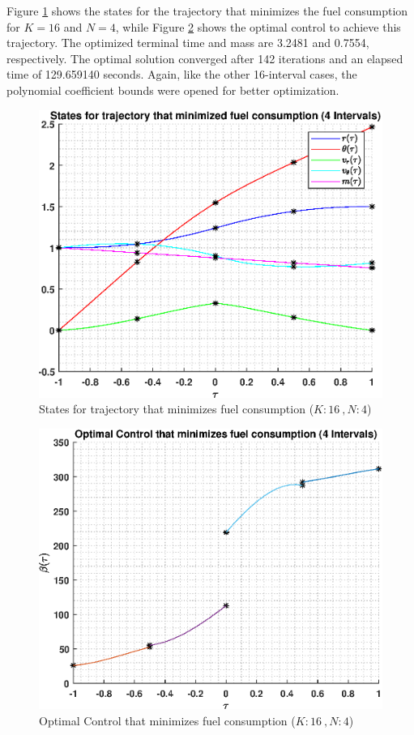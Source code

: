 \documentclass[]{article}
\begin{document}
\vspace{2mm}\newline 
Figure \ref{fig:directStatesK16Poly4} shows the states for the trajectory that minimizes the fuel consumption for \(K = 16\) and  \(N = 4\), while Figure \ref{fig:directControlK16Poly4} shows the optimal control to achieve this trajectory. The optimized terminal time and mass are 3.2481 and 0.7554, respectively. The optimal solution converged after 142 iterations and an elapsed time of 129.659140 seconds. Again, like the other 16-interval cases, the polynomial coefficient bounds were opened for better optimization. 
\begin{figure}
	\centering
	\includegraphics[scale=0.75]{directStatesK16Poly4.eps}
	\caption{States for trajectory that minimizes fuel consumption (\(K:16\ , N:4\))}
	\label{fig:directStatesK16Poly4}
\end{figure}
\begin{figure}
	\centering
	\includegraphics[scale=0.75]{directControlK16Poly4.eps}
	\caption{Optimal Control that minimizes fuel consumption (\(K:16\ , N:4\))}
	\label{fig:directControlK16Poly4}
\end{figure}
\end{document}
